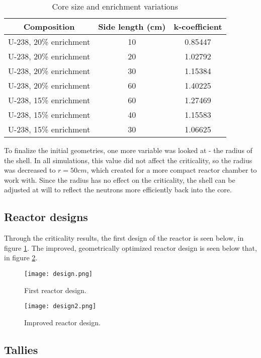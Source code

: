 \begin{table}[!htbp]
\centering
\caption{Core size and enrichment variations}
\label{tab:variations}
\begin{tabular}{|c|c|c|}
\hline
Composition            & Side length (cm) & k-coefficient \\
\hline
U-238, 20\% enrichment & 10               & 0.85447       \\
\hline
U-238, 20\% enrichment & 20               & 1.02792       \\
\hline
U-238, 20\% enrichment & 30               & 1.15384       \\
\hline
U-238, 20\% enrichment & 60               & 1.40225       \\
\hline
U-238, 15\% enrichment & 60               & 1.27469       \\
\hline
U-238, 15\% enrichment & 40               & 1.15583       \\
\hline
U-238, 15\% enrichment & 30               & 1.06625      \\
\hline
\end{tabular}
\end{table}

To finalize the initial geometries, one more variable was looked at - the radius of the shell. In all simulations, this value did not affect the criticality, so the radius was decreased to $r=50cm$, which created for a more compact reactor chamber to work with. Since the radius has no effect on the criticality, the shell can be adjusted at will to reflect the neutrons more efficiently back into the core.

\subsection{Reactor designs}
Through the criticality results, the first design of the reactor is seen below, in figure \ref{fig:design1}. The improved, geometrically optimized reactor design is seen below that, in figure \ref{fig:design2}.
\begin{figure}[!htbp]
\caption{First reactor design.}
\label{fig:design1}
\centering
\texttt{[image: design.png]}
\end{figure}

\begin{figure}[!htbp]
\caption{Improved reactor design.}
\label{fig:design2}
\centering
\texttt{[image: design2.png]}
\end{figure}
\subsection{Tallies}
